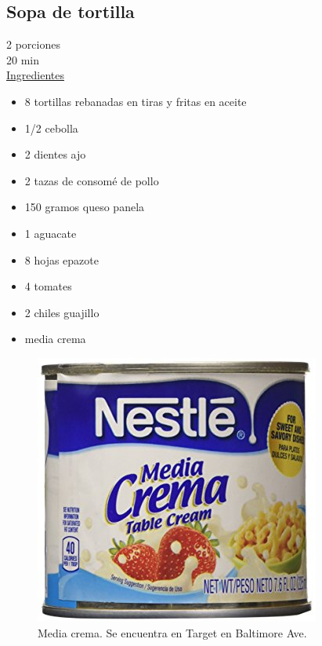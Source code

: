 \subsection{Sopa de tortilla}\label{sopa_tortilla}

2 porciones\\
20 min \\


\underline{Ingredientes}
\begin{itemize}
\item 8 tortillas rebanadas en tiras y fritas en aceite
\item 1/2 cebolla
\item 2 dientes ajo
\item 2 tazas de consomé de pollo 
\item 150 gramos queso panela
\item 1 aguacate
\item 8 hojas epazote
\item 4 tomates
\item 2 chiles guajillo 
\item media crema 
\end{itemize}

\begin{figure}[H]
\centering
\includegraphics[scale=0.2]{recetas/figures/media_crema}
\caption{Media crema. Se encuentra en Target en Baltimore Ave.}
\end{figure}

